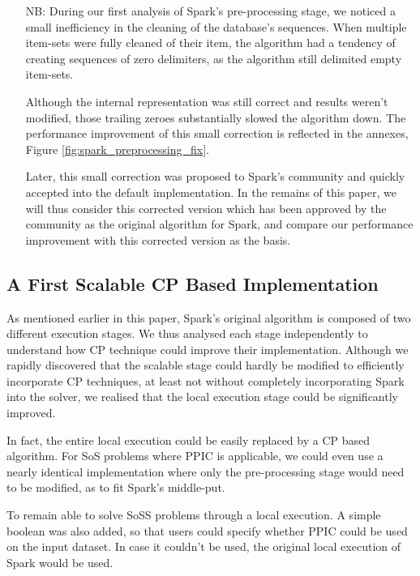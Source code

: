 \documentclass{eplmastersthesis}
\begin{document}
\begin{itemize}
  \item[NB:] During our first analysis of Spark's pre-processing stage, we noticed a small inefficiency in the cleaning of the database's sequences. When multiple item-sets were fully cleaned of their item, the algorithm had a tendency of creating sequences of zero delimiters, as the algorithm still delimited empty item-sets.

Although the internal representation was still correct and results weren't modified, those trailing zeroes substantially slowed the algorithm down.
The performance improvement of this small correction is reflected in the annexes, Figure \ref{fig:spark_preprocessing_fix}.

Later, this small correction was proposed to Spark's community and quickly accepted into the default implementation. In the remains of this paper, we will thus consider this corrected version which has been approved by the community as the original algorithm for Spark, and compare our performance improvement with this corrected version as the basis.
\end{itemize}

\subsection{A First Scalable CP Based Implementation}

As mentioned earlier in this paper, Spark's original algorithm is composed of two different execution stages. We thus analysed each stage independently to understand how CP technique could improve their implementation. Although we rapidly discovered that the scalable stage could hardly be modified to efficiently incorporate CP techniques, at least not without completely incorporating Spark into the solver, we realised that the local execution stage could be significantly improved. \newline

In fact, the entire local execution could be easily replaced by a CP based algorithm. For \acrshort{SoS} problems where PPIC is applicable, we could even use a nearly identical implementation where only the pre-processing stage would need to be modified, as to fit Spark's middle-put. \newline

To remain able to solve \acrshort{SoSS} problems through a local execution. A simple boolean was also added, so that users could specify whether PPIC could be used on the input dataset. In case it couldn't be used, the original local execution of Spark would be used. \newline
\end{document}
